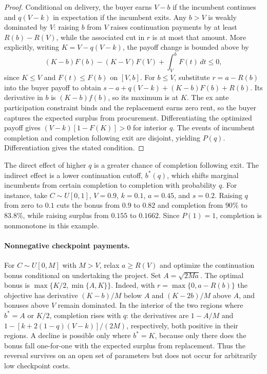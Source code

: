 \documentclass[11pt]{article}
\begin{document}
\begin{proof}
Conditional on delivery, the buyer earns $V-b$ if the incumbent continues and $q(V-k)$ in expectation if the incumbent exits. Any $b>V$ is weakly dominated by $V$: raising $b$ from $V$ raises continuation payments by at least $R(b)-R(V)$, while the associated cut in $r$ is at most that amount. More explicitly, writing $K=V-q(V-k)$, the payoff change is bounded above by
\[
 (K-b)F(b)-(K-V)F(V)+\int_V^b F(t)\,dt\leq 0,
\]
since $K\leq V$ and $F(t)\leq F(b)$ on $[V,b]$. For $b\leq V$, substitute $r=a-R(b)$ into the buyer payoff to obtain $s-a+q(V-k)+(K-b)F(b)+R(b)$. Its derivative in $b$ is $(K-b)f(b)$, so its maximum is at $K$. The ex ante participation constraint binds and the replacement earns zero rent, so the buyer captures the expected surplus from procurement. Differentiating the optimized payoff gives $(V-k)[1-F(K)]>0$ for interior $q$. The events of incumbent completion and completion following exit are disjoint, yielding $P(q)$. Differentiation gives the stated condition.
\end{proof}

The direct effect of higher $q$ is a greater chance of completion following exit. The indirect effect is a lower continuation cutoff, $b^*(q)$, which shifts marginal incumbents from certain completion to completion with probability $q$. For instance, take $C\sim U[0,1]$, $V=0.9$, $k=0.1$, $a=0.45$, and $s=0.2$. Raising $q$ from zero to $0.1$ cuts the bonus from $0.9$ to $0.82$ and completion from $90\%$ to $83.8\%$, while raising surplus from $0.155$ to $0.1662$. Since $P(1)=1$, completion is nonmonotone in this example.

\paragraph{Nonnegative checkpoint payments.}
For $C\sim U[0,M]$ with $M>V$, relax $a\geq R(V)$ and optimize the continuation bonus conditional on undertaking the project. Set $A=\sqrt{2Ma}$. The optimal bonus is $\max\{K/2,\min\{A,K\}\}$. Indeed, with $r=\max\{0,a-R(b)\}$ the objective has derivative $(K-b)/M$ below $A$ and $(K-2b)/M$ above $A$, and bonuses above $V$ remain dominated. In the interior of the two regions where $b^*=A$ or $K/2$, completion rises with $q$: the derivatives are $1-A/M$ and $1-[k+2(1-q)(V-k)]/(2M)$, respectively, both positive in their regions. A decline is possible only where $b^*=K$, because only there does the bonus fall one-for-one with the expected surplus from replacement. Thus the reversal survives on an open set of parameters but does not occur for arbitrarily low checkpoint costs.
\end{document}
